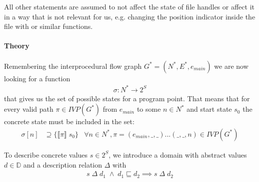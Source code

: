 All other statements are assumed to not affect the state of file handles or affect it in a way that is not relevant for us, e.g. changing the position indicator inside the file with  or similar functions.

\paragraph*{Theory}
Remembering the interprocedural flow graph $G^* = (N^*, E^*, e_{main})$ we are now looking for a function
\begin{align}
\sigma : N^* \to 2^S
\end{align}
that gives us the set of possible states for a program point.
That means that for every valid path $\pi \in \mathit{IVP}(G^*)$ from $e_{main}$ to some $n \in N^*$ and start state $s_0$ the concrete state must be included in the set:
\begin{align}
\sigma[n] &\supseteq \{ \llbracket \pi \rrbracket \; s_0 \}		&\forall n \in N^*, \pi = (e_{main},\_,\_)...(\_,\_,n) \in \mathit{IVP}(G^*)
\end{align}

To describe concrete values $s \in 2^S$, we introduce a domain with abstract values $d \in \mathbb{D}$ and a description relation $\Delta$ with
\begin{align}
s \;\Delta\; d_1 \;\wedge\; d_1 \sqsubseteq d_2 \implies s \;\Delta\; d_2
\end{align}


%
%
%


